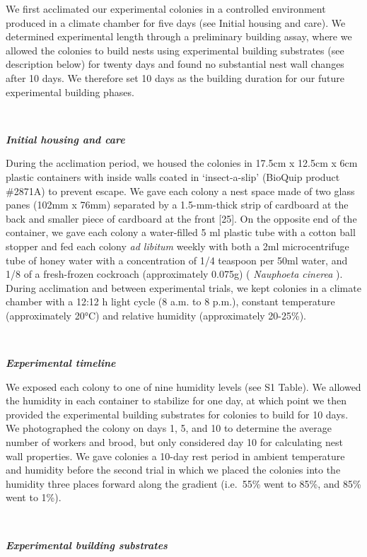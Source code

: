 \documentclass[3p]{elsarticle} %
\begin{document}
We first acclimated our experimental colonies in a controlled
environment produced in a climate chamber for five days (see Initial
housing and care). We determined experimental length through a
preliminary building assay, where we allowed the colonies to build nests
using experimental building substrates (see description below) for
twenty days and found no substantial nest wall changes after 10 days. We
therefore set 10 days as the building duration for our future
experimental building phases.

~

\textbf{\emph{Initial housing and care}}

During the acclimation period, we housed the colonies in 17.5cm x 12.5cm
x 6cm plastic containers with inside walls coated in `insect-a-slip'
(BioQuip product \#2871A) to prevent escape. We gave each colony a nest
space made of two glass panes (102mm x 76mm) separated by a 1.5-mm-thick
strip of cardboard at the back and smaller piece of cardboard at the
front {[}25{]}. On the opposite end of the container, we gave each
colony a water-filled 5 ml plastic tube with a cotton ball stopper and
fed each colony \emph{ad libitum} weekly with both a 2ml microcentrifuge
tube of honey water with a concentration of 1/4 teaspoon per 50ml water,
and 1/8 of a fresh-frozen cockroach (approximately 0.075g) (
\emph{Nauphoeta cinerea} ). During acclimation and between experimental
trials, we kept colonies in a climate chamber with a 12:12 h light cycle
(8 a.m. to 8 p.m.), constant temperature (approximately 20°C) and
relative humidity (approximately 20-25\%).

~

\textbf{\emph{Experimental timeline}}

We exposed each colony to one of nine humidity levels (see S1 Table). We
allowed the humidity in each container to stabilize for one day, at
which point we then provided the experimental building substrates for
colonies to build for 10 days. We photographed the colony on days 1, 5,
and 10 to determine the average number of workers and brood, but only
considered day 10 for calculating nest wall properties. We gave colonies
a 10-day rest period in ambient temperature and humidity before the
second trial in which we placed the colonies into the humidity three
places forward along the gradient (i.e.~55\% went to 85\%, and 85\% went
to 1\%).

~

\textbf{\emph{Experimental building substrates}}
\end{document}
